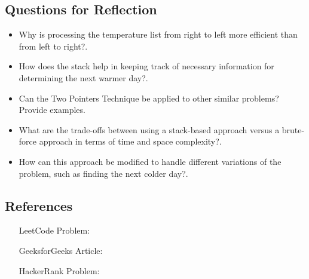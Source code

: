 \subsection*{Questions for Reflection}
\begin{itemize}
    \item Why is processing the temperature list from right to left more efficient than from left to right?.
    
    \item How does the stack help in keeping track of necessary information for determining the next warmer day?.
    
    \item Can the Two Pointers Technique be applied to other similar problems? Provide examples.
    
    \item What are the trade-offs between using a stack-based approach versus a brute-force approach in terms of time and space complexity?.
    
    \item How can this approach be modified to handle different variations of the problem, such as finding the next colder day?.
\end{itemize}

\subsection*{References}
\begin{itemize}
    \item [LeetCode Problem:] 
    \item [GeeksforGeeks Article:] 
    \item [HackerRank Problem:] 
\end{itemize}

